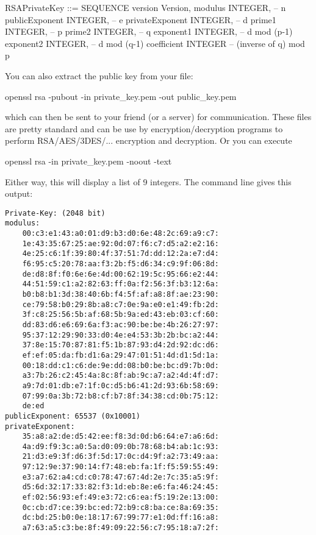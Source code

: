 \begin{ex}
{\begin{console}
   RSAPrivateKey ::= SEQUENCE {
     version Version,
     modulus INTEGER, -- n
     publicExponent INTEGER, -- e
     privateExponent INTEGER, -- d
     prime1 INTEGER, -- p
     prime2 INTEGER, -- q
     exponent1 INTEGER, -- d mod (p-1)
     exponent2 INTEGER, -- d mod (q-1)
     coefficient INTEGER -- (inverse of q) mod p }
\end{console}
}
You can also extract the public key from your file:
{\small
\begin{console}
openssl rsa -pubout -in private_key.pem -out public_key.pem
\end{console}
}
which can then be sent to your friend (or a server)
for communication.
These files are pretty standard and can be use by
encryption/decryption programs to perform
RSA/AES/3DES/... encryption and decryption.
Or you can execute
{\small
\begin{console}
openssl rsa -in private_key.pem -noout -text
\end{console}
}
Either way, this will display a list of 9 integers.
The command line gives this output:
{\scriptsize
\begin{Verbatim}[frame=single]
Private-Key: (2048 bit)
modulus:
    00:c3:e1:43:a0:01:d9:b3:d0:6e:48:2c:69:a9:c7:
    1e:43:35:67:25:ae:92:0d:07:f6:c7:d5:a2:e2:16:
    4e:25:c6:1f:39:80:4f:37:51:7d:dd:12:2a:e7:d4:
    f6:95:c5:20:78:aa:f3:2b:f5:d6:34:c9:9f:06:8d:
    de:d8:8f:f0:6e:6e:4d:00:62:19:5c:95:66:e2:44:
    44:51:59:c1:a2:82:63:ff:0a:f2:56:3f:b3:12:6a:
    b0:b8:b1:3d:38:40:6b:f4:5f:af:a8:8f:ae:23:90:
    ce:79:58:b0:29:8b:a8:c7:0e:9a:e0:e1:49:fb:2d:
    3f:c8:25:56:5b:af:68:5b:9a:ed:43:eb:03:cf:60:
    dd:83:d6:e6:69:6a:f3:ac:90:be:be:4b:26:27:97:
    95:37:12:29:90:33:d0:4e:e4:53:3b:2b:bc:a2:44:
    37:8e:15:70:87:81:f5:1b:87:93:d4:2d:92:dc:d6:
    ef:ef:05:da:fb:d1:6a:29:47:01:51:4d:d1:5d:1a:
    00:18:dd:c1:c6:de:9e:dd:08:b0:be:bc:d9:7b:0d:
    a3:7b:26:c2:45:4a:8c:8f:ab:9c:a7:a2:4d:4f:d7:
    a9:7d:01:db:e7:1f:0c:d5:b6:41:2d:93:6b:58:69:
    07:99:0a:3b:72:b8:cf:b7:8f:34:38:cd:0b:75:12:
    de:ed
publicExponent: 65537 (0x10001)
privateExponent:
    35:a8:a2:de:d5:42:ee:f8:3d:0d:b6:64:e7:a6:6d:
    4a:d9:f9:3c:a0:5a:d0:09:0b:78:68:b4:ab:1c:93:
    21:d3:e9:3f:d6:3f:5d:17:0c:d4:9f:a2:73:49:aa:
    97:12:9e:37:90:14:f7:48:eb:fa:1f:f5:59:55:49:
    e3:a7:62:a4:cd:c0:78:47:67:4d:2e:7c:35:a5:9f:
    d5:6d:32:17:33:82:f3:1d:eb:8e:e6:fa:46:24:45:
    ef:02:56:93:ef:49:e3:72:c6:ea:f5:19:2e:13:00:
    0c:cb:d7:ce:39:bc:ed:72:b9:c8:ba:ce:8a:69:35:
    dc:bd:25:b0:0e:18:17:67:99:77:e1:0d:ff:16:a8:
    a7:63:a5:c3:be:8f:49:09:22:56:c7:95:18:a7:2f:

\end{Verbatim}}
\end{ex}
